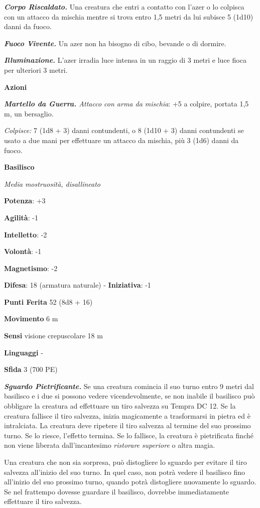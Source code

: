 \begin{multicols}{2}
\emph{\textbf{Corpo Riscaldato.}} Una creatura che entri a contatto con
l'azer o lo colpisca con un attacco da mischia mentre si trova entro 1,5
metri da lui subisce 5 (1d10) danni da fuoco.

\emph{\textbf{Fuoco Vivente.}} Un azer non ha bisogno di cibo, bevande o
di dormire.

\emph{\textbf{Illuminazione.}} L'azer irradia luce intensa in un raggio
di 3 metri e luce fioca per ulteriori 3 metri.

\textbf{Azioni}

\emph{\textbf{Martello da Guerra.} Attacco con arma da mischia}: +5 a
colpire, portata 1,5 m, un bersaglio.

\emph{Colpisce:} 7 (1d8 + 3) danni contundenti, o 8 (1d10 + 3) danni
contundenti se usato a due mani per effettuare un attacco da mischia,
più 3 (1d6) danni da fuoco.

\textbf{Basilisco}

\emph{Media mostruosità, disallineato}

\textbf{Potenza}: +3

\textbf{Agilità}: -1

\textbf{Intelletto}: -2

\textbf{Volontà}: -1

\textbf{Magnetismo}: -2

\textbf{Difesa}: 18 (armatura naturale) - \textbf{Iniziativa}: -1

\textbf{Punti Ferita} 52 (8d8 + 16)

\textbf{Movimento} 6 m

\textbf{Sensi} visione crepuscolare 18 m

\textbf{Linguaggi} -

\textbf{Sfida} 3 (700 PE)

\emph{\textbf{Sguardo Pietrificante.}} Se una creatura comincia il suo
turno entro 9 metri dal basilisco e i due si possono vedere
vicendevolmente, se non inabile il basilisco può obbligare la creatura ad effettuare un tiro salvezza su Tempra DC 12. Se la creatura fallisce il tiro  salvezza, inizia magicamente a trasformarsi in pietra ed è   intralciata. La creatura deve ripetere il tiro salvezza al termine del   suo prossimo turno. Se lo riesce, l'effetto termina. Se lo fallisce,   la creatura è pietrificata finché non viene liberata dall'incantesimo  \emph{ristorare} \emph{superiore} o altra magia.


Una creatura che non sia sorpresa, può distogliere lo sguardo per
evitare il tiro salvezza all'inizio del suo turno. In quel caso, non
potrà vedere il basilisco fino all'inizio del suo prossimo turno, quando
potrà distogliere nuovamente lo sguardo. Se nel frattempo dovesse
guardare il basilisco, dovrebbe immediatamente effettuare il tiro
salvezza.


\end{multicols}
